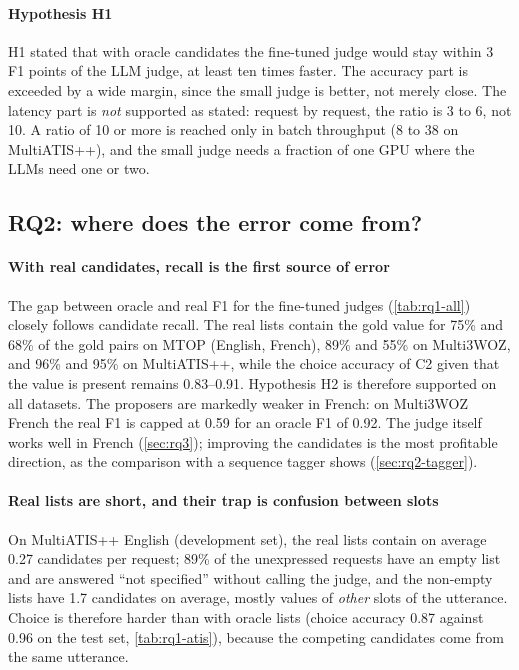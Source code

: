 \paragraph{Hypothesis H1} H1 stated that with oracle candidates the fine-tuned judge would stay within 3 F1 points of the LLM judge, at least ten times faster. The accuracy part is exceeded by a wide margin, since the small judge is better, not merely close. The latency part is \emph{not} supported as stated: request by request, the ratio is 3 to 6, not 10. A ratio of 10 or more is reached only in batch throughput (8 to 38 on MultiATIS++), and the small judge needs a fraction of one GPU where the LLMs need one or two.

\subsection{RQ2: where does the error come from?}
\label{sec:rq2}

\paragraph{With real candidates, recall is the first source of error} The gap between oracle and real F1 for the fine-tuned judges (\cref{tab:rq1-all}) closely follows candidate recall. The real lists contain the gold value for 75\% and 68\% of the gold pairs on MTOP (English, French), 89\% and 55\% on Multi3WOZ, and 96\% and 95\% on MultiATIS++, while the choice accuracy of C2 given that the value is present remains 0.83--0.91. Hypothesis H2 is therefore supported on all datasets. The proposers are markedly weaker in French: on Multi3WOZ French the real F1 is capped at 0.59 for an oracle F1 of 0.92. The judge itself works well in French (\cref{sec:rq3}); improving the candidates is the most profitable direction, as the comparison with a sequence tagger shows (\cref{sec:rq2-tagger}).

\paragraph{Real lists are short, and their trap is confusion between slots} On MultiATIS++ English (development set), the real lists contain on average 0.27 candidates per request; 89\% of the unexpressed requests have an empty list and are answered ``not specified'' without calling the judge, and the non-empty lists have 1.7 candidates on average, mostly values of \emph{other} slots of the utterance. Choice is therefore harder than with oracle lists (choice accuracy 0.87 against 0.96 on the test set, \cref{tab:rq1-atis}), because the competing candidates come from the same utterance.

